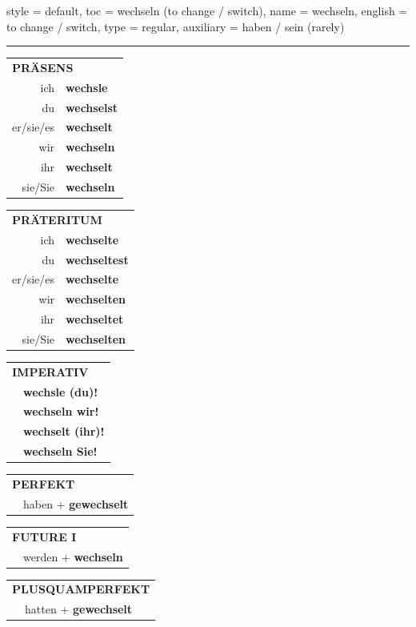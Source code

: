 \begin{verbentry}{
  style = {default},
  toc = {wechseln (to change / switch)},
  name = {wechseln},
  english = {to change / switch},
  type = {regular},
  auxiliary = {haben / sein (rarely)}
}
 

\vspace{5pt}
\hrule
\vspace{5pt}

\begin{tabular}{rl}
\multicolumn{2}{l}{\textbf{PRÄSENS}}\\
ich & \textbf{wechsle}\\
du & \textbf{wechselst}\\
er/sie/es & \textbf{wechselt}\\
wir & \textbf{wechseln}\\
ihr & \textbf{wechselt}\\
sie/Sie & \textbf{wechseln}\\
\end{tabular}
\hfill
\begin{tabular}{rl}
\multicolumn{2}{l}{\textbf{PRÄTERITUM}}\\
ich & \textbf{wechselte}\\
du & \textbf{wechseltest}\\
er/sie/es & \textbf{wechselte}\\
wir & \textbf{wechselten}\\
ihr & \textbf{wechseltet}\\
sie/Sie & \textbf{wechselten}\\
\end{tabular}
\hfill
\begin{tabular}{rl}
\multicolumn{2}{l}{\textbf{IMPERATIV}}\\
& \textbf{wechsle (du)!}\\
& \textbf{wechseln wir!}\\
& \textbf{wechselt (ihr)!}\\
& \textbf{wechseln Sie!}\\
\end{tabular}

\vspace{10pt}

\begin{tabular}{rl}
\multicolumn{2}{l}{\textbf{PERFEKT}}\\
& haben + \textbf{gewechselt}\\
\end{tabular}
\hfill
\begin{tabular}{rl}
\multicolumn{2}{l}{\textbf{FUTURE I}}\\
& werden + \textbf{wechseln}\\
\end{tabular}
\hfill
\begin{tabular}{rl}
\multicolumn{2}{l}{\textbf{PLUSQUAMPERFEKT}}\\
& hatten + \textbf{gewechselt}\\
\end{tabular}


\end{verbentry}
